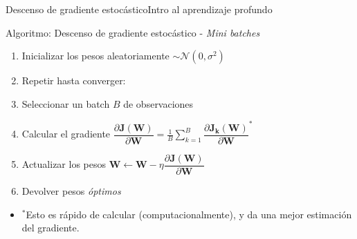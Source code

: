 \documentclass[10pt,border=3pt,tikz]{beamer}
\begin{document}
    \begin{frame}{Descenso de gradiente estocástico}{Intro al aprendizaje profundo}
        \begin{block}{Algoritmo: Descenso de gradiente estocástico - \textit{Mini batches}}
            \begin{enumerate}
                \item Inicializar los pesos aleatoriamente $\sim \mathcal{N}(0,\sigma^2)$
                \item Repetir hasta converger:
                \item \hspace*{8pt} Seleccionar un batch $B$ de observaciones
                \item \hspace*{8pt} Calcular el gradiente \colorbox{yellow!20}{$\dfrac{\partial \mathbf{J(W)}}{\partial \mathbf{W}} = \frac{1}{B} \sum_{k=1}^B \dfrac{\partial \mathbf{J_k(W)}}{\partial \mathbf{W}}^*$}
                \item \hspace*{8pt} Actualizar los pesos $\mathbf{W} \leftarrow \mathbf{W} - \eta \dfrac{\partial \mathbf{J(W)}}{\partial \mathbf{W}}$
                \item Devolver pesos \textit{óptimos}
            \end{enumerate}
        \end{block}
        \begin{itemize}
            \item $^*$Esto es rápido de calcular (computacionalmente), y da una mejor estimación del gradiente.
        \end{itemize}
    \end{frame}
    
    
    
\end{document}
